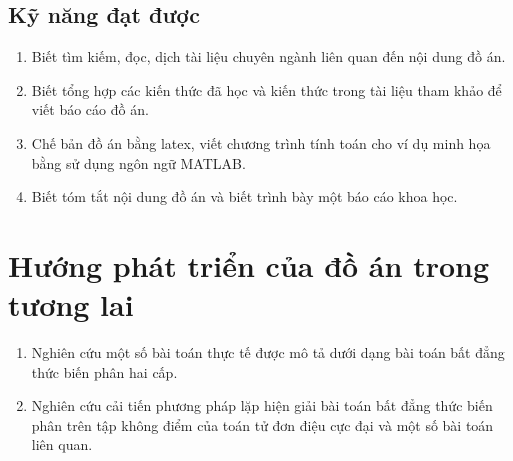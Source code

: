 \documentclass[14pt, oneside,A4paper]{book}
\theoremstyle{plain}
\begin{document}
\subsection*{Kỹ năng đạt được}

\begin{enumerate}
	\item  Biết tìm kiếm, đọc, dịch tài liệu chuyên ngành liên quan đến nội dung đồ án.
	\item Biết tổng hợp các kiến thức đã học và kiến thức trong tài liệu tham khảo để viết báo cáo đồ án.
	\item Chế bản đồ án bằng latex, viết chương trình tính toán cho ví dụ minh họa bằng sử dụng ngôn ngữ MATLAB.
	\item Biết tóm tắt nội dung đồ án và biết trình bày một báo cáo khoa học. 
\end{enumerate}


\section{Hướng phát triển của đồ án trong tương lai}

\begin{enumerate}
	\item Nghiên cứu một số bài toán thực tế được mô tả dưới dạng bài toán bất đẳng thức biến phân hai cấp.
	\item Nghiên cứu cải tiến phương pháp lặp hiện giải bài toán bất đẳng thức biến phân trên tập không điểm của toán tử đơn điệu cực đại và một số bài toán liên quan.
\end{enumerate}


                     
\end{document}
